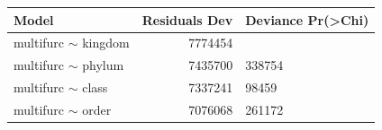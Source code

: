         \begin{center}
          \begin{tabular}{ |l|r|l| }
            \hline
            Model & Residuals Dev & Deviance Pr(>Chi) \\
            \hline \hline
            multifurc $\sim$ kingdom & 7774454 & \\
            multifurc $\sim$ phylum & 7435700 & 338754 \\
            multifurc $\sim$ class & 7337241 & 98459 \\
            \rowcolor{green} multifurc $\sim$ order & 7076068 & 261172 \\

            




\end{tabular}
\end{center}
